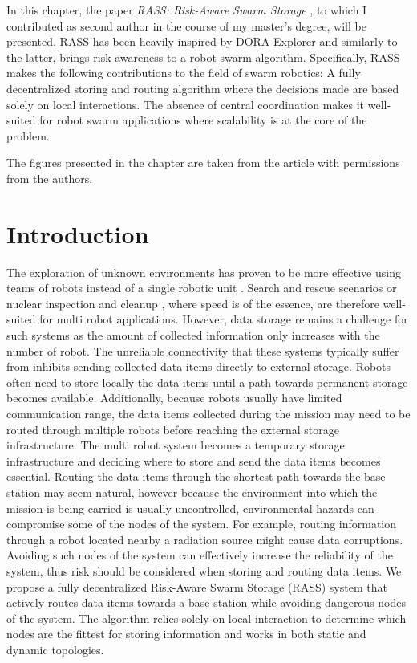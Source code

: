 \label{sec:Theme2}

In this chapter, the paper \textit{RASS: Risk-Aware Swarm Storage} \cite{arseneault2022rass}, to which I contributed as second author in the course of my master's degree, will be presented. RASS has been heavily inspired by DORA-Explorer and similarly to the latter, brings risk-awareness to a robot swarm algorithm. Specifically, RASS makes the following contributions to the field of swarm robotics: A fully decentralized storing and routing algorithm where the decisions made are based solely on local interactions. The absence of central coordination makes it well-suited for robot swarm applications where scalability is at the core of the problem.

The figures presented in the chapter are taken from the article \cite{arseneault2022rass} with permissions from the authors. 


\section{Introduction}
The exploration of unknown environments has proven to be more effective using teams of robots instead of a single robotic unit \cite{burgard2005coordinated}. Search and rescue scenarios \cite{kantor2003search} or nuclear inspection and cleanup \cite{schwagerMultirobotControlPolicy2017}, where speed is of the essence, are therefore well-suited for multi robot applications. However, data storage remains a challenge for such systems as the amount of collected information only increases with the number of robot. The unreliable connectivity that these systems typically suffer from \cite{amigoni2017multirobot} inhibits sending collected data items directly to external storage. Robots often need to store locally the data items until a path towards permanent storage becomes available. Additionally, because robots usually have limited communication range, the data items collected during the mission may need to be routed through multiple robots before reaching the external storage infrastructure. The multi robot system becomes a temporary storage infrastructure and deciding where to store and send the data items becomes essential. Routing the data items through the shortest path towards the base station may seem natural, however because the environment into which the mission is being carried is usually uncontrolled, environmental hazards can compromise some of the nodes of the system. For example, routing information through a robot located nearby a radiation source might cause data corruptions. Avoiding such nodes of the system can effectively increase the reliability of the system, thus risk should be considered when storing and routing data items. We propose a fully decentralized Risk-Aware Swarm Storage (RASS) system that actively routes data items towards a base station while avoiding dangerous nodes of the system. The algorithm relies solely on local interaction to determine which nodes are the fittest for storing information and works in both static and dynamic topologies.


